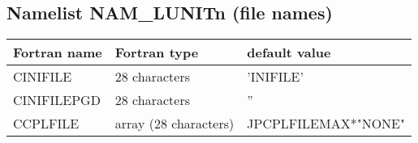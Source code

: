 \subsection{Namelist NAM\_LUNITn (file names)}

\begin{center}
\begin{tabular} {|l|l|l|}
\hline
Fortran name & Fortran type & default value \\
\hline
CINIFILE   &  28 characters  &  'INIFILE'  \\
CINIFILEPGD   &  28 characters  &  ''  \\
CCPLFILE   & array (28 characters)  &  JPCPLFILEMAX*"NONE"  \\
\hline
\end{tabular}
\end{center}


